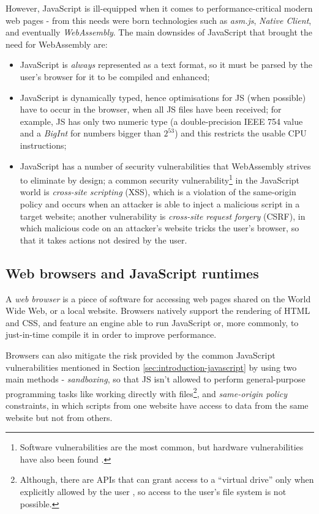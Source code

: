 However, JavaScript is ill-equipped when it comes to performance-critical modern web
pages - from this needs were born technologies such as \textit{asm.js}, \textit{Native Client}, and eventually \textit{WebAssembly}.
The main downsides of JavaScript that brought the need for WebAssembly are:
\begin{itemize}
  \item JavaScript is \textit{always} represented as a text format, so it must be parsed by the user's browser for it to be compiled and enhanced;
  \item JavaScript is dynamically typed, hence optimisations for JS (when possible) have to occur
        in the browser, when all JS files have been received;
        for example, JS has only two numeric type (a double-precision IEEE 754 value and a \textit{BigInt}
        for numbers bigger than $2^{53}$) and this restricts the usable CPU instructions;
  \item JavaScript has a number of security vulnerabilities that WebAssembly strives to eliminate by design;
        a common security vulnerability\footnote{Software vulnerabilities are the most common, but hardware vulnerabilities have also been found \cite{spectre}.}
        in the JavaScript world is \textit{cross-site scripting} (XSS), which is a violation of the
        same-origin policy and occurs when an attacker is able to inject a malicious script in a target website;
        another vulnerability is \textit{cross-site request forgery} (CSRF), in which malicious code on an attacker's website
        tricks the user's browser, so that it takes actions not desired by the user.
\end{itemize}

\subsection{Web browsers and JavaScript runtimes}

A \textit{web browser} is a piece of software for accessing web pages shared on the World Wide Web, or a
local website. Browsers natively support the rendering of HTML and CSS, and feature an engine able to run JavaScript or, more commonly,
to just-in-time compile it in order to improve performance.

Browsers can also mitigate the risk provided by the common JavaScript vulnerabilities mentioned in Section \ref{sec:introduction-javascript}
by using two main methods - \textit{sandboxing}, so that JS isn't allowed to perform general-purpose
programming tasks like working directly with files\footnote{Although, there are APIs that can grant access to a ``virtual drive''
only when explicitly allowed by the user \cite{filesystem-mdn}, so access to the user's file system is not possible.},
and \textit{same-origin policy} constraints, in which scripts from one website have access to data from the same website but not from others.

